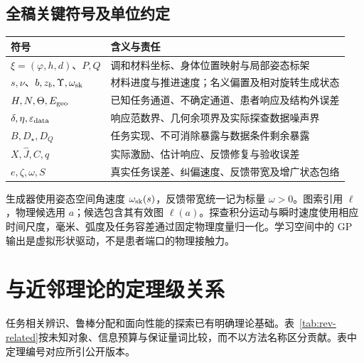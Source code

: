 \documentclass[11pt,a4paper]{article}
\numberwithin{equation}{section}
\theoremstyle{definition}
\begin{document}
\subsection{全稿关键符号及单位约定}
\begin{center}\small
\begin{tabularx}{\linewidth}{lY}
\toprule
符号 & 含义与责任\\
\midrule
$\xi=(\varphi,h,d)$、$P,Q$ & 调和材料坐标、身体位置映射与局部姿态标架\\
$s,\nu$、$b,z_b,\Upsilon,\omega_{\rm sk}$ & 材料进度与推进速度；名义偏置及相对旋转生成状态\\
$H,N,\Theta,E_{\rm geo}$ & 已知任务通道、不确定通道、患者响应及结构外误差\\
$\delta,\eta,\varepsilon_{\rm data}$ & 响应范数界、几何余项界及实际探查数据噪声界\\
$B,D_\star,D_Q$ & 任务实现、不可消除暴露与数据条件剩余暴露\\
$X,\widehat J,C,q$ & 实际激励、估计响应、反馈修复与验收误差\\
$e,\zeta,\omega,S$ & 真实任务误差、纠偏速度、反馈带宽及增广状态包络\\
\bottomrule
\end{tabularx}\end{center}
生成器使用姿态空间角速度 $\omega_{\rm sk}(s)$，反馈带宽统一记为标量 $\omega>0$。图索引用 $\ell$，物理候选用 $a$；候选包含其有效图 $\ell(a)$。探查积分运动与瞬时速度使用相应时间尺度，毫米、弧度及任务容差通过固定物理度量归一化。学习空间中的 GP 输出是虚拟形状驱动，不是患者端口的物理接触力。



\section{与近邻理论的定理级关系}
\label{sec:rev-related}
任务相关辨识、鲁棒分配和面向性能的探索已有明确理论基础。表~\ref{tab:rev-related}按未知对象、信息预算与保证量词比较，而不以方法名称区分贡献。表中定理编号对应所引公开版本。
\end{document}
